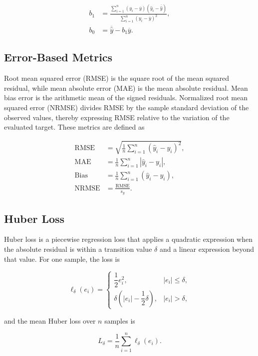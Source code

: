 \begin{align}
b_1 &=
\frac{\sum_{i=1}^{n}\left(y_i-\overline{y}\right)
\left(\widehat{y}_i-\overline{\widehat{y}}\right)}
{\sum_{i=1}^{n}\left(y_i-\overline{y}\right)^2},
\label{eq:regression_slope}\\
b_0 &= \overline{\widehat{y}}-b_1\overline{y}.
\label{eq:regression_intercept}
\end{align}

\subsection{Error-Based Metrics}

Root mean squared error (RMSE) is the square root of the mean squared residual, while mean absolute error (MAE) is the mean absolute residual. Mean bias error is the arithmetic mean of the signed residuals. Normalized root mean squared error (NRMSE) divides RMSE by the sample standard deviation of the observed values, thereby expressing RMSE relative to the variation of the evaluated target. These metrics are defined as

\begin{align}
\mathrm{RMSE} &=
\sqrt{\frac{1}{n}\sum_{i=1}^{n}
\left(\widehat{y}_i-y_i\right)^2},
\label{eq:rmse_definition}\\
\mathrm{MAE} &=
\frac{1}{n}\sum_{i=1}^{n}
\left|\widehat{y}_i-y_i\right|,
\label{eq:mae_definition}\\
\mathrm{Bias} &=
\frac{1}{n}\sum_{i=1}^{n}
\left(\widehat{y}_i-y_i\right),
\label{eq:bias_definition}\\
\mathrm{NRMSE} &= \frac{\mathrm{RMSE}}{s_y}.
\label{eq:nrmse_definition}
\end{align}

\subsection{Huber Loss}

Huber loss is a piecewise regression loss that applies a quadratic expression when the absolute residual is within a transition value \(\delta\) and a linear expression beyond that value. For one sample, the loss is

\begin{equation}
\ell_{\delta}(e_i)=
\begin{cases}
\dfrac{1}{2}e_i^2, & \left|e_i\right|\leq\delta,\\[4pt]
\delta\left(\left|e_i\right|-\dfrac{1}{2}\delta\right),
& \left|e_i\right|>\delta,
\end{cases}
\label{eq:huber_sample_loss}
\end{equation}

and the mean Huber loss over \(n\) samples is

\begin{equation}
L_{\delta}=\frac{1}{n}\sum_{i=1}^{n}\ell_{\delta}(e_i).
\label{eq:mean_huber_loss}
\end{equation}

